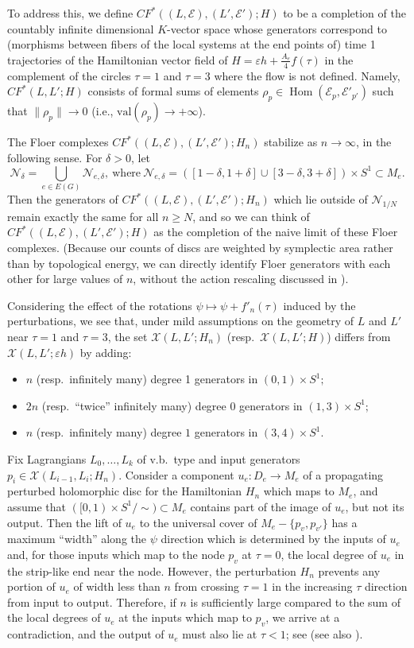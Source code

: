 \documentclass[11pt,leqno]{amsart}
\numberwithin{equation}{section}
\def\val{\mathrm{val}}
\def\Hom{\operatorname{Hom}}
\newcommand{\cN}{{\mathcal N}}
\newcommand{\cE}{{\mathcal E}}
\newcommand{\cX}{{\mathcal X}}
\begin{document}
To address this, we define $CF^*((L,\cE),(L',\cE');H)$ to be a completion of
the countably infinite dimensional $K$-vector space whose generators correspond to
(morphisms between fibers of the local systems at the end points of) time 1
trajectories of the Hamiltonian vector field of $H=\varepsilon h+\frac{A_e}{4}f(\tau)$
in the complement of the circles $\tau=1$ and $\tau=3$ where the flow is not defined.
Namely, $CF^*(L,L';H)$ consists of formal sums of elements
$\rho_p\in\Hom(\cE_{p},\cE'_{p'})$ such that $\|\rho_p\|\to 0$ (i.e., $\val(\rho_p)\to+\infty$).

The Floer complexes
$CF^*((L,\cE),(L',\cE');H_n)$ stabilize as $n\to \infty$, in the following
sense. For $\delta>0$, let $$\cN_{\delta}=\bigcup_{e\in E(G)}
\cN_{e,\delta},\ \text{where}\ \cN_{e,\delta}=([1-\delta,1+\delta]\cup
[3-\delta,3+\delta])\times S^1\subset M_e.$$
Then the generators of
$CF^*((L,\cE),(L',\cE');H_n)$ which lie outside of $\cN_{1/N}$ remain
exactly the same for all $n\geq N$, and so we can think of
$CF^*((L,\cE),(L',\cE');H)$ as the completion of the naive limit of these Floer complexes.
(Because our counts of discs are weighted by symplectic area rather than by topological
energy, we can directly identify Floer generators with each other for large
values of $n$, without the action rescaling discussed in \cite{AuSm}).

Considering the effect of the rotations $\psi\mapsto \psi+f'_n(\tau)$
induced by the perturbations, we see that, under mild assumptions on the geometry of $L$ and $L'$ near $\tau=1$ and
$\tau=3$, the set $\cX(L,L';H_n)$ (resp.\ $\cX(L,L';H)$) differs from $\cX(L,L';\varepsilon h)$
by adding:
\begin{itemize}
\item $n$ (resp.\ infinitely many) degree 1 generators in $(0,1)\times S^1;$

\item $2n$ (resp.\ ``twice'' infinitely many) degree 0 generators in $(1,3)\times S^1;$

\item $n$ (resp.\ infinitely many) degree $1$ generators in $(3,4)\times S^1.$ 
\end{itemize}

Fix Lagrangians $L_0,\dots,L_k$ of v.b.~type and input generators
$p_i\in \cX(L_{i-1},L_i;H_n)$. 
Consider a component $u_e:D_e\to M_e$ of a propagating perturbed
holomorphic disc for the Hamiltonian $H_n$ which maps to $M_e$, and assume
that $([0,1)\times S^1/\sim) \subset M_e$ contains part of the
image of $u_e$, but not its output. Then the lift of $u_e$ to the universal cover of
$M_e-\{p_v,p_{v'}\}$ has a maximum ``width'' along the $\psi$ direction which is
determined by the inputs of $u_e$ and, for those inputs which map to
the node $p_v$ at $\tau=0$, the local degree of $u_e$ in the strip-like end
near the node. However, the perturbation $H_n$ prevents any 
portion of $u_e$ of width less than $n$ from crossing $\tau=1$ in the
increasing $\tau$ direction from input to output. Therefore, if $n$ is
sufficiently large compared to the sum of the local degrees of $u_e$ at the inputs
which map to $p_v$, we arrive at a contradiction, and the output of $u_e$
must also lie at $\tau<1$; see \cite[Lemma 3.5]{Lee} (see also
\cite[Proposition 5.5]{AuSm}). 
\end{document}
